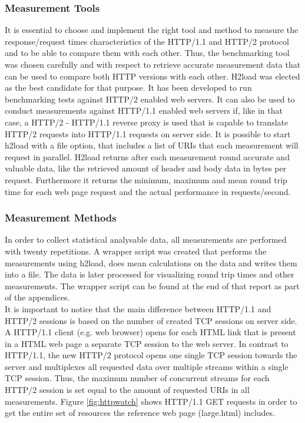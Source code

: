 \subsubsection{Measurement Tools}
It is essential to choose and implement the right tool and method to measure the response/request times characteristics of the HTTP/1.1 and HTTP/2 protocol and to be able to compare them with each other. Thus, the benchmarking tool was chosen carefully and with respect to retrieve accurate measurement data that can be used to compare both HTTP versions with each other. 
H2load \cite{h2load} was elected as the best candidate for that purpose. It has been developed to run benchmarking tests against HTTP/2 enabled web servers. 
It can also be used to conduct measurements against HTTP/1.1 enabled web servers if, like in that case, a HTTP/2 - HTTP/1.1 reverse proxy is used that is capable to translate HTTP/2 requests into HTTP/1.1 requests on server side. 
It is possible to start h2load with a file option, that includes a list of URIs that each measurement will request in parallel. H2load returns after each measurement round accurate and valuable data, like the retrieved  amount of header and body data in bytes per request. Furthermore it returns the minimum, maximum and mean round trip time for each web page request and the actual performance in requests/second. 
\\
\subsubsection{Measurement Methods}
In order to collect statistical analysable data, all measurements are performed with twenty repetitions. A wrapper script was created that performs the measurements using h2load, does mean calculations on the data and writes them into a file. The data is later processed for visualizing round trip times and other measurements. The wrapper script can be found at the end of that report as part of the appendices. 
\\
It is important to notice that the main difference between HTTP/1.1 and HTTP/2 sessions is based on the number of created TCP sessions on server side. A HTTP/1.1 client (e.g. web browser) opens for each HTML link that is present in a HTML web page a separate TCP session to the web server. In contrast to HTTP/1.1, the new HTTP/2 protocol opens one single TCP session towards the server and multiplexes all requested data over multiple streams within a single TCP session. Thus, the maximum number of concurrent streams for each HTTP/2 session is set equal to the amount of requested URIs in all measurements. Figure \ref{fig:httpwatch} shows HTTP/1.1 GET requests in order to get the entire set of resources the reference web page (large.html) includes.


